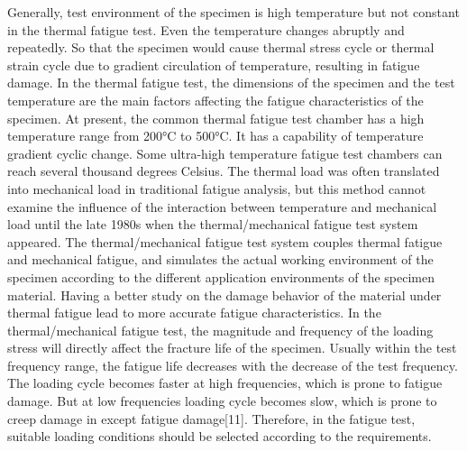 Generally, test environment of the specimen is high temperature but not constant in the thermal fatigue test. Even the temperature changes abruptly and repeatedly. So that the specimen would cause thermal stress cycle or thermal strain cycle due to gradient circulation of temperature, resulting in fatigue damage. In the thermal fatigue test, the dimensions of the specimen and the test temperature are the main factors affecting the fatigue characteristics of the specimen. At present, the common thermal fatigue test chamber has a high temperature range from 200°C to 500°C. It has a capability of temperature gradient cyclic change. Some ultra-high temperature fatigue test chambers can reach several thousand degrees Celsius. The thermal load was often translated into mechanical load in traditional fatigue analysis, but this method cannot examine the influence of the interaction between temperature and mechanical load until the late 1980s when the thermal/mechanical fatigue test system appeared. The thermal/mechanical fatigue test system couples thermal fatigue and mechanical fatigue, and simulates the actual working environment of the specimen according to the different application environments of the specimen material. Having a better study on the damage behavior of the material under thermal fatigue lead to more accurate fatigue characteristics. In the thermal/mechanical fatigue test, the magnitude and frequency of the loading stress will directly affect the fracture life of the specimen. Usually within the test frequency range, the fatigue life decreases with the decrease of the test frequency. The loading cycle becomes faster at high frequencies, which is prone to fatigue damage. But at low frequencies loading cycle becomes slow, which is prone to creep damage in except fatigue damage[11]. Therefore, in the fatigue test, suitable loading conditions should be selected according to the requirements.


